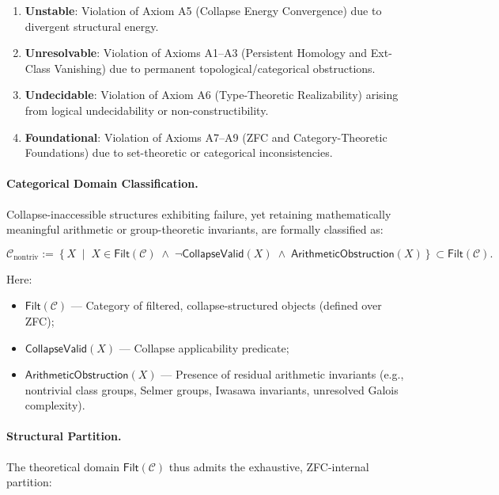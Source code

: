 \documentclass[11pt]{article}
\begin{document}
\begin{enumerate}
    \item \textbf{Unstable}: Violation of Axiom A5 (Collapse Energy Convergence) due to divergent structural energy.
    \item \textbf{Unresolvable}: Violation of Axioms A1–A3 (Persistent Homology and Ext-Class Vanishing) due to permanent topological/categorical obstructions.
    \item \textbf{Undecidable}: Violation of Axiom A6 (Type-Theoretic Realizability) arising from logical undecidability or non-constructibility.
    \item \textbf{Foundational}: Violation of Axioms A7–A9 (ZFC and Category-Theoretic Foundations) due to set-theoretic or categorical inconsistencies.
\end{enumerate}

\paragraph{Categorical Domain Classification.}

Collapse-inaccessible structures exhibiting failure, yet retaining mathematically meaningful arithmetic or group-theoretic invariants, are formally classified as:

\[
\mathcal{C}_{\mathrm{nontriv}} := \left\{ X \;\middle|\; X \in \mathsf{Filt}(\mathcal{C}) \;\land\; \neg \mathsf{CollapseValid}(X) \;\land\; \mathsf{ArithmeticObstruction}(X) \right\} \subset \mathsf{Filt}(\mathcal{C}).
\]

Here:
\begin{itemize}
    \item $\mathsf{Filt}(\mathcal{C})$ — Category of filtered, collapse-structured objects (defined over ZFC);
    \item $\mathsf{CollapseValid}(X)$ — Collapse applicability predicate;
    \item $\mathsf{ArithmeticObstruction}(X)$ — Presence of residual arithmetic invariants (e.g., nontrivial class groups, Selmer groups, Iwasawa invariants, unresolved Galois complexity).
\end{itemize}

\paragraph{Structural Partition.}

The theoretical domain $\mathsf{Filt}(\mathcal{C})$ thus admits the exhaustive, ZFC-internal partition:
\end{document}
